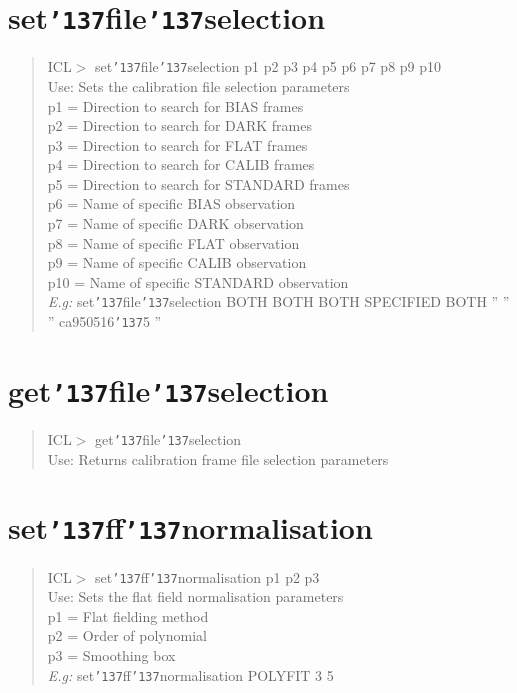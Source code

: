 \documentclass[a4paper]{book}
\renewcommand{\_}{{\tt\char'137}}
\begin{document}
\section{set\_file\_selection}
\begin{quote}
ICL$>$ set\_file\_selection p1 p2 p3 p4 p5 p6 p7 p8 p9 p10 \\
Use: Sets the calibration file selection parameters \\
p1 = Direction to search for BIAS frames \\
p2 = Direction to search for DARK frames \\
p3 = Direction to search for FLAT frames \\
p4 = Direction to search for CALIB frames \\
p5 = Direction to search for STANDARD frames \\
p6 = Name of specific BIAS observation \\
p7 = Name of specific DARK observation \\
p8 = Name of specific FLAT observation \\
p9 = Name of specific CALIB observation \\
p10 = Name of specific STANDARD observation \\
{\em E.g:} set\_file\_selection BOTH BOTH BOTH SPECIFIED BOTH '' '' '' ca950516\_5 ''
\end{quote}

\section{get\_file\_selection}
\begin{quote}
ICL$>$ get\_file\_selection \\
Use: Returns calibration frame file selection parameters
\end{quote}

\section{set\_ff\_normalisation}
\begin{quote}
ICL$>$ set\_ff\_normalisation p1 p2 p3 \\
Use: Sets the flat field normalisation parameters \\
p1 = Flat fielding method \\
p2 = Order of polynomial \\
p3 = Smoothing box \\
{\em E.g:} set\_ff\_normalisation POLYFIT 3 5
\end{quote}
\end{document}
